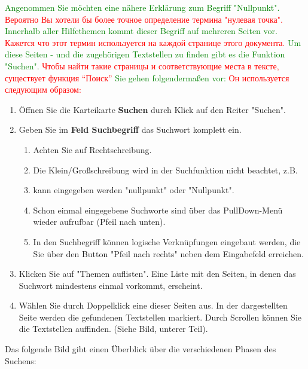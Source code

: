 \documentclass[14pt,a4paper]{book}
\newcommand{\DE}[1]{\textcolor{green}{#1}}
\newcommand{\RU}[1]{\textcolor{red}{#1}}
\begin{document}
\DE{Angenommen Sie möchten eine nähere Erklärung zum Begriff "Nullpunkt".}
\RU{Вероятно Вы хотели бы более точное определение термина
"нулевая точка".}
\DE{Innerhalb aller Hilfethemen kommt dieser Begriff auf mehreren Seiten vor.}
\RU{Кажется что этот термин используется на каждой странице этого
документа.}
\DE{Um diese Seiten - und die zugehörigen Textstellen zu finden gibt es die
Funktion "Suchen".}
\RU{Чтобы найти такие страницы и соответствующие места в тексте,
существует функция ``Поиск''}
\DE{Sie gehen folgendermaßen vor:}
\RU{Он используется следующим образом:}
\begin{enumerate}
  \item Öffnen Sie die Karteikarte \textbf{Suchen} durch Klick auf den Reiter
  "Suchen".
  \item Geben Sie im \textbf{Feld Suchbegriff} das Suchwort komplett ein. 
\begin{enumerate}
  \item Achten Sie auf Rechtschreibung. 
  \item Die Klein/Großschreibung wird in der Suchfunktion nicht beachtet, z.B.
  \item kann eingegeben werden "nullpunkt" oder "Nullpunkt".
  \item Schon einmal eingegebene Suchworte sind über das PullDown-Menü wieder
  aufrufbar (Pfeil nach unten).
  \item In den Suchbegriff können logische Verknüpfungen eingebaut werden, die
Sie über den Button "Pfeil nach rechts" neben dem Eingabefeld erreichen.
\end{enumerate}
  \item Klicken Sie auf "Themen auflisten". Eine Liste mit den Seiten, in denen
das Suchwort mindestens einmal vorkommt, erscheint.
  \item Wählen Sie durch Doppelklick eine dieser Seiten aus. In der
dargestellten Seite werden die gefundenen Textstellen markiert. Durch Scrollen können
 Sie die Textstellen auffinden. (Siehe Bild, unterer Teil).
\end{enumerate}

\bigskip

Das folgende Bild gibt einen Überblick über die verschiedenen Phasen des Suchens:
\end{document}
